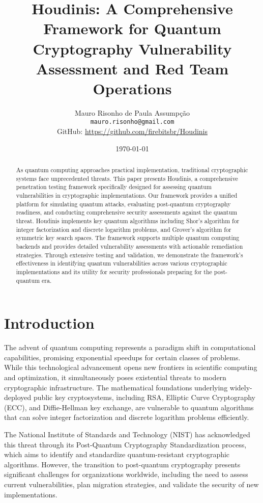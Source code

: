\documentclass[11pt]{article}
\title{Houdinis: A Comprehensive Framework for Quantum Cryptography Vulnerability Assessment and Red Team Operations}
\author{
Mauro Risonho de Paula Assumpção\\
\texttt{mauro.risonho@gmail.com}\\
GitHub: \url{https://github.com/firebitsbr/Houdinis}
}
\date{\today}
\begin{document}
\maketitle

\begin{abstract}
As quantum computing approaches practical implementation, traditional cryptographic systems face unprecedented threats. This paper presents Houdinis, a comprehensive penetration testing framework specifically designed for assessing quantum vulnerabilities in cryptographic implementations. Our framework provides a unified platform for simulating quantum attacks, evaluating post-quantum cryptography readiness, and conducting comprehensive security assessments against the quantum threat. Houdinis implements key quantum algorithms including Shor's algorithm for integer factorization and discrete logarithm problems, and Grover's algorithm for symmetric key search spaces. The framework supports multiple quantum computing backends and provides detailed vulnerability assessments with actionable remediation strategies. Through extensive testing and validation, we demonstrate the framework's effectiveness in identifying quantum vulnerabilities across various cryptographic implementations and its utility for security professionals preparing for the post-quantum era.
\end{abstract}

\section{Introduction}

The advent of quantum computing represents a paradigm shift in computational capabilities, promising exponential speedups for certain classes of problems. While this technological advancement opens new frontiers in scientific computing and optimization, it simultaneously poses existential threats to modern cryptographic infrastructure. The mathematical foundations underlying widely-deployed public key cryptosystems, including RSA, Elliptic Curve Cryptography (ECC), and Diffie-Hellman key exchange, are vulnerable to quantum algorithms that can solve integer factorization and discrete logarithm problems efficiently.

The National Institute of Standards and Technology (NIST) has acknowledged this threat through its Post-Quantum Cryptography Standardization process, which aims to identify and standardize quantum-resistant cryptographic algorithms. However, the transition to post-quantum cryptography presents significant challenges for organizations worldwide, including the need to assess current vulnerabilities, plan migration strategies, and validate the security of new implementations.
\end{document}
